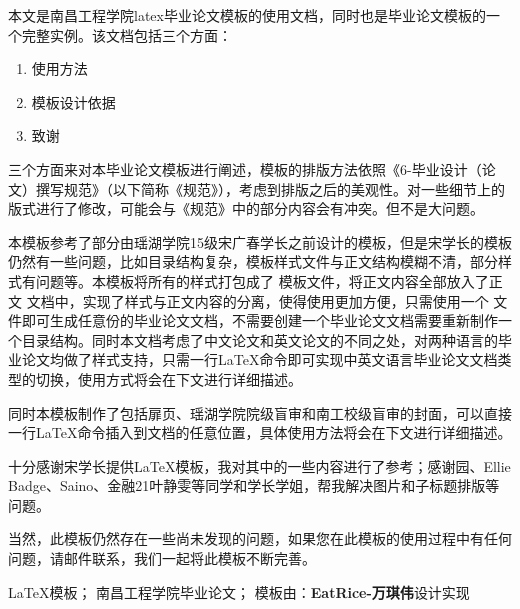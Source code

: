 \begin{CHAbstract}

    本文是南昌工程学院latex毕业论文模板的使用文档，同时也是毕业论文模板的一个完整实例。该文档包括三个方面：
    
    \begin{enumerate}
        \item 使用方法
        \item 模板设计依据
        \item 致谢
    \end{enumerate}
    
    三个方面来对本毕业论文模板进行阐述，模板的排版方法依照《6-毕业设计（论文）撰写规范》（以下简称《规范》），考虑到排版之后的美观性。对一些细节上的版式进行了修改，可能会与《规范》中的部分内容会有冲突。但不是大问题。

    本模板参考了部分由瑶湖学院15级宋广春学长之前设计的模板，但是宋学长的模板仍然有一些问题，比如目录结构复杂，模板样式文件与正文结构模糊不清，部分样式有问题等。本模板将所有的样式打包成了 模板文件，将正文内容全部放入了正文 文档中，实现了样式与正文内容的分离，使得使用更加方便，只需使用一个 文件即可生成任意份的毕业论文文档，不需要创建一个毕业论文文档需要重新制作一个目录结构。同时本文档考虑了中文论文和英文论文的不同之处，对两种语言的毕业论文均做了样式支持，只需一行\LaTeX{}命令即可实现中英文语言毕业论文文档类型的切换，使用方式将会在下文进行详细描述。
    
    同时本模板制作了包括扉页、瑶湖学院院级盲审和南工校级盲审的封面，可以直接一行\LaTeX{}命令插入到文档的任意位置，具体使用方法将会在下文进行详细描述。

    十分感谢宋学长提供\LaTeX{}模板，我对其中的一些内容进行了参考；感谢园、Ellie Badge、Saino、金融21叶静雯等同学和学长学姐，帮我解决图片和子标题排版等问题。

    当然，此模板仍然存在一些尚未发现的问题，如果您在此模板的使用过程中有任何问题，请邮件联系，我们一起将此模板不断完善。

\end{CHAbstract}


\begin{CHKeyWords}
\LaTeX 模板；
南昌工程学院毕业论文；
模板由：\textbf{EatRice-万琪伟}设计实现
\end{CHKeyWords}